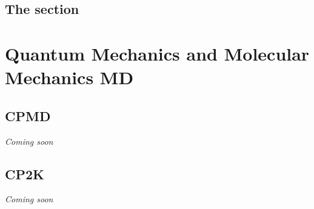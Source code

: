 \subsection*{The  section}

\section{Quantum Mechanics and Molecular Mechanics MD}

\subsection{CPMD}

{\em{Coming soon}}

\subsection{CP2K}

{\em{Coming soon}}

